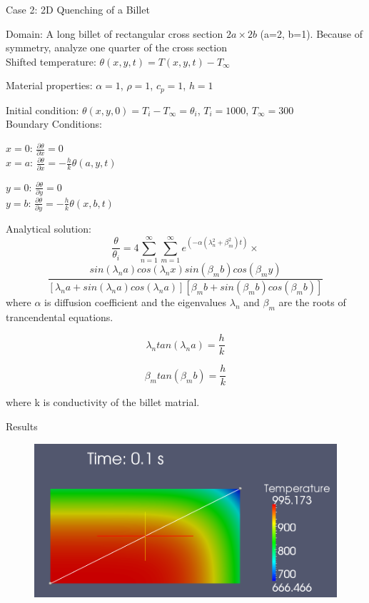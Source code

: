 \documentclass[t,english]{beamer}
\begin{document}
\begin{frame}[c]{Case 2: 2D Quenching of a Billet\cite{jw}}

Domain: A long billet of rectangular cross section $2a \times 2b$ (a=2, b=1). Because of symmetry, analyze one quarter of the cross section 
\\
Shifted temperature: $\theta(x,y,t) = T(x,y,t) - T_{\infty}$

Material properties: $\alpha = 1$, $\rho = 1$, $c_p = 1$, $h = 1$

Initial condition: $\theta (x,y,0) = T_i - T_{\infty} = \theta_i$, $T_i = 1000$, $T_{\infty} = 300$
\\
Boundary Conditions: 
\begin{multicols}{2}
 $x = 0$:  $\frac{\partial \theta}{\partial x} = 0$\\$x = a$:  $\frac{\partial \theta}{\partial x} = -\frac{h}{k} \theta (a,y,t)$
 
\columnbreak
$y = 0$:  $\frac{\partial \theta}{\partial y} = 0$\\ $y = b$: $\frac{\partial \theta}{\partial y} = -\frac{h}{k} \theta (x,b,t)$
\end{multicols}
\end{frame}

\begin{frame}

Analytical solution:$$\frac{\theta}{\theta_i} = 4 \sum_{n=1}^{\infty} \sum_{m=1}^{\infty} e^{(-\alpha(\lambda_n^2 + \beta_m^2) t)}\times$$ $$ \frac{sin(\lambda_n a) cos(\lambda_n x) sin(\beta_m b) cos(\beta_m y)}{[\lambda_n a + sin(\lambda_n a)cos(\lambda_n a)][\beta_m b + sin(\beta_m b)cos(\beta_m b)]} $$ where $\alpha$ is diffusion coefficient and  the eigenvalues $\lambda_n$ and $\beta_m$ are the roots of trancendental equations.
\begin{multicols}{2}
$$\lambda_n tan(\lambda_n a) = \frac{h}{k}$$

\columnbreak
$$\beta_m tan(\beta_m b) = \frac{h}{k}$$
\end{multicols}
 where k is conductivity of the billet matrial.
\end{frame}

\begin{frame}[c]{Results}
\begin{figure}[ht!]
\centering
\includegraphics[scale=0.4]{billet_paraview.png}
\end{figure}
\end{frame}
\end{document}
